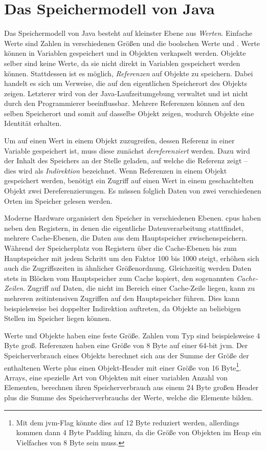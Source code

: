 \section{Das Speichermodell von Java}\label{sec:memory-model}

Das Speichermodell von Java besteht auf kleinster Ebene aus \emph{Werten}.
Einfache Werte sind Zahlen in verschiedenen Größen und die boolschen Werte  und .
Werte können in Variablen gespeichert und in Objekten verkapselt werden.
Objekte selber sind keine Werte, da sie nicht direkt in Variablen gespeichert werden können.
Stattdessen ist es möglich, \emph{Referenzen} auf Objekte zu speichern.
Dabei handelt es sich um Verweise, die auf den eigentlichen Speicherort des Objekts zeigen.
Letzterer wird von der Java-Laufzeitumgebung verwaltet und ist nicht durch den Programmierer beeinflussbar.
Mehrere Referenzen können auf den selben Speicherort und somit auf dasselbe Objekt zeigen, wodurch Objekte eine Identität erhalten.

Um auf einen Wert in einem Objekt zuzugreifen, dessen Referenz in einer Variable gespeichert ist, muss diese zunächst \emph{dereferenziert} werden.
Dazu wird der Inhalt des Speichers an der Stelle geladen, auf welche die Referenz zeigt -- dies wird als \emph{Indirektion} bezeichnet.
Wenn Referenzen in einem Objekt gespeichert werden, benötigt ein Zugriff auf einen Wert in einem geschachtelten Objekt zwei Dereferenzierungen.
Es müssen folglich Daten von zwei verschiedenen Orten im Speicher gelesen werden.

Moderne Hardware organisiert den Speicher in verschiedenen Ebenen.
\acp{cpu} haben neben den Registern, in denen die eigentliche Datenverarbeitung stattfindet, mehrere Cache-Ebenen, die Daten aus dem Hauptspeicher zwischenspeichern.
Während der Speicherplatz von Registern über die Cache-Ebenen bis zum Hauptspeicher mit jedem Schritt um den Faktor 100 bis 1000 steigt, erhöhen sich auch die Zugriffszeiten in ähnlicher Größenordnung.
Gleichzeitig werden Daten stets in Blöcken vom Hauptspeicher zum Cache kopiert, den sogenannten \emph{Cache-Zeilen}.
Zugriff auf Daten, die nicht im Bereich einer Cache-Zeile liegen, kann zu mehreren zeitintensiven Zugriffen auf den Hauptspeicher führen.
Dies kann beispielsweise bei doppelter Indirektion auftreten, da Objekte an beliebigen Stellen im Speicher liegen können.

Werte und Objekte haben eine feste Größe.
Zahlen vom Typ  sind beispielsweise 4 Byte groß.
Referenzen haben eine Größe von 8 Byte auf einer 64-bit \ac{jvm}.
Der Speicherverbrauch eines Objekts berechnet sich aus der Summe der Größe der enthaltenen Werte plus einen Objekt-Header mit einer Größe von 16 Byte\footnote{Mit dem \ac{jvm}-Flag  könnte dies auf 12 Byte reduziert werden, allerdings kommen dann 4 Byte Padding hinzu, da die Größe von Objekten im Heap ein Vielfaches von 8 Byte sein muss.}.
Arrays, eine spezielle Art von Objekten mit einer variablen Anzahl von Elementen, berechnen ihren Speicherverbrauch aus einem 24 Byte großen Header plus die Summe des Speicherverbrauchs der Werte, welche die Elemente bilden.
~\cite{compressed-oops}

